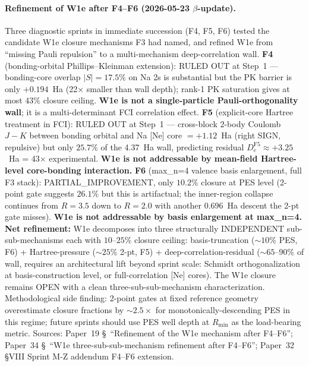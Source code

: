 \documentclass[aps,pra,twocolumn,superscriptaddress,longbibliography,floatfix]{revtex4-2}
\begin{document}
\paragraph{Refinement of W1e after F4--F6 (2026-05-23
$\beta$-update).} Three diagnostic sprints in immediate succession (F4, F5, F6)
tested the candidate W1e closure mechanisms F3 had named, and
refined W1e from ``missing Pauli repulsion'' to a multi-mechanism
deep-correlation wall. \textbf{F4} (bonding-orbital
Phillips--Kleinman extension): RULED OUT at Step~1 --- bonding-core
overlap $|S| = 17.5\%$ on Na 2s is substantial but the PK barrier is
only $+0.194$~Ha (22$\times$ smaller than wall depth); rank-1 PK
saturation gives at most $43\%$ closure ceiling. \textbf{W1e is not
a single-particle Pauli-orthogonality wall}; it is a multi-determinant
FCI correlation effect. \textbf{F5} (explicit-core Hartree treatment
in FCI): RULED OUT at Step~1 --- cross-block 2-body Coulomb $J - K$
between bonding orbital and Na [Ne] core $= +1.12$~Ha (right SIGN,
repulsive) but only $25.7\%$ of the 4.37~Ha wall, predicting
residual $D_e^\text{F5} \approx +3.25$~Ha = 43$\times$ experimental.
\textbf{W1e is not addressable by mean-field Hartree-level
core-bonding interaction.} \textbf{F6} (max\_n=4 valence basis
enlargement, full F3 stack): PARTIAL\_IMPROVEMENT, only $10.2\%$
closure at PES level (2-point gate suggests $26.1\%$ but this is
artifactual; the inner-region collapse continues from $R = 3.5$ down
to $R = 2.0$ with another $0.696$~Ha descent the 2-pt gate misses).
\textbf{W1e is not addressable by basis enlargement at max\_n=4.}
\textbf{Net refinement:} W1e decomposes into three structurally
INDEPENDENT sub-sub-mechanisms each with $10$--$25\%$ closure
ceiling: basis-truncation ($\sim 10\%$ PES, F6) +
Hartree-pressure ($\sim 25\%$ 2-pt, F5) +
deep-correlation-residual ($\sim 65$--$90\%$ of wall, requires
an architectural lift beyond sprint scale: Schmidt orthogonalization at
basis-construction level, or full-correlation [Ne] cores). The W1e
closure remains OPEN with a clean three-sub-sub-mechanism
characterization. Methodological side finding: 2-point gates at
fixed reference geometry overestimate closure fractions by
${\sim}2.5\times$ for monotonically-descending PES in this regime;
future sprints should use PES well depth at $R_\text{min}$ as the
load-bearing metric. Sources: Paper~19
\S~``Refinement of the W1e mechanism after F4--F6''; Paper~34
\S~``W1e three-sub-sub-mechanism refinement after F4--F6''; Paper~32 \S VIII Sprint M-Z
addendum F4--F6 extension.
\end{document}
